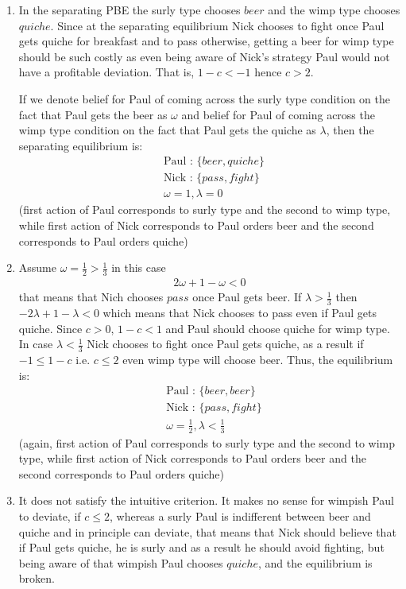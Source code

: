 \documentclass[a4paper]{article}
\begin{document}
\begin{enumerate}
	\item In the separating PBE the surly type chooses $beer$ and the wimp type chooses $quiche$. Since at the separating equilibrium Nick chooses to fight once Paul gets quiche for breakfast and to pass otherwise, getting a beer for wimp type should be such costly as even being aware of Nick's strategy Paul would not have a profitable deviation. That is, $1 - c < -1$ hence $c > 2$.
	
	If we denote belief for Paul of coming across the surly type condition on the fact that Paul gets the beer as $\omega$ and  belief for Paul of coming across the wimp type condition on the fact that Paul gets the quiche as $\lambda$, then the separating equilibrium is:
	\begin{align*}
	&\text{Paul : } \{beer, quiche\}\\
	&\text{Nick : } \{pass, fight\}\\
	& \omega = 1, \lambda = 0
	\end{align*}
	(first action of Paul corresponds to surly type and the second to wimp type, while first action of Nick corresponds to Paul orders beer and the second corresponds to Paul orders quiche)
	\item Assume $\omega = \frac{1}{2} > \frac{1}{3}$ in this case
	\begin{align*}
	2\omega + 1 - \omega < 0
	\end{align*}
	that means that Nich chooses $pass$ once Paul gets beer. If $\lambda > \frac{1}{3}$ then $-2\lambda + 1 - \lambda < 0$ which means that Nick chooses to pass even if Paul gets quiche. Since $c > 0$, $1 - c < 1$ and Paul should choose quiche for wimp type. In case $\lambda < \frac{1}{3}$ Nick chooses to fight once Paul gets quiche, as a result if $-1 \le 1 - c$ i.e. $c \le 2$ even wimp type will choose beer.
	Thus, the equilibrium is:
	\begin{align*}
	&\text{Paul : } \{beer, beer\}\\
	&\text{Nick : } \{pass, fight\}\\
	& \omega = \frac{1}{2}, \lambda < \frac{1}{3}
	\end{align*}
	(again, first action of Paul corresponds to surly type and the second to wimp type, while first action of Nick corresponds to Paul orders beer and the second corresponds to Paul orders quiche)
	\item It does not satisfy the intuitive criterion. It makes no sense for wimpish Paul to deviate, if $c \le 2$, whereas a surly Paul is indifferent between beer and quiche and in principle can deviate, that means that Nick should believe that if Paul gets quiche, he is surly and as a result he should avoid fighting, but being aware of that wimpish Paul chooses $quiche$, and the equilibrium is broken.
\end{enumerate}
\end{document}
